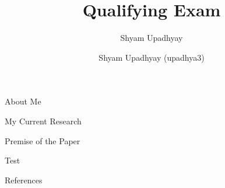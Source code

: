 

\author{Shyam Upadhyay}
\title{Qualifying Exam}

\date{Shyam Upadhyay (upadhya3)} 



\begin{frame}
\titlepage
\end{frame}

\begin{frame}{About Me}
\end{frame}

\begin{frame}{My Current Research}
\end{frame}

\begin{frame}{Premise of the Paper}
  \begin{example}
    Test
  \end{example}
\end{frame}






\begin{frame}[allowframebreaks]{References}
  \def\newblock{}
  
  
\end{frame}


